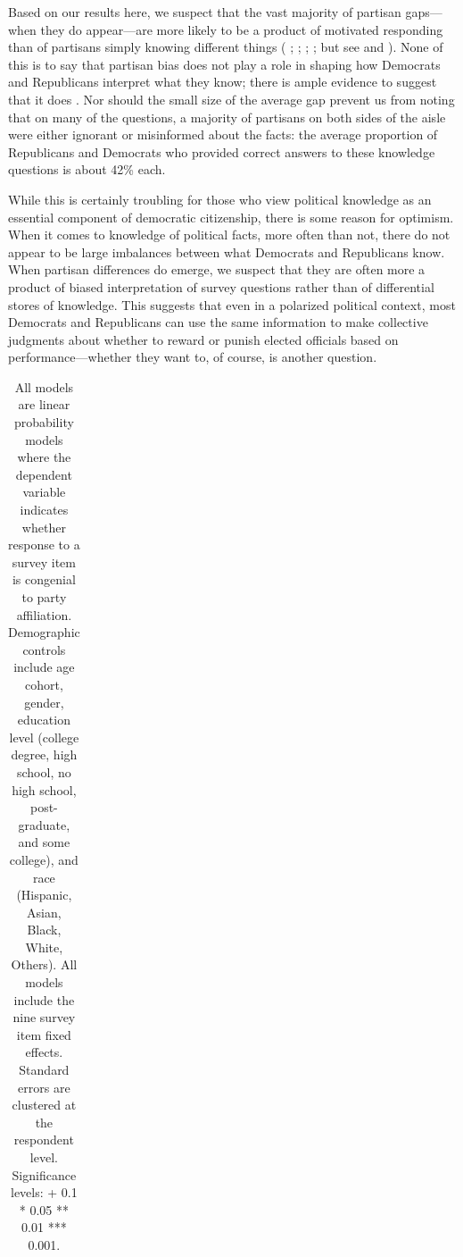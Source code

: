 \documentclass[12pt, letterpaper]{article}
\begin{document}
Based on our results here, we suspect that the vast majority of partisan gaps---when they do appear---are more likely to be a product of motivated responding than of partisans simply knowing different things (\citeauthor{bisgaard_slothuus_2018} \citeyear{bisgaard_slothuus_2018}; \citeauthor {bullocketal_2015} \citeyear{bullocketal_2015}; \citeauthor{prior2015you} \citeyear{prior2015you}; \citeauthor{schaffner_luks} \citeyear{schaffner_luks}; but see \citeauthor{berinsky_2017} \citeyear{berinsky_2017} and \citeauthor{peterson_iyengar_forth} \citeyear{peterson_iyengar_forth}). None of this is to say that partisan bias does not play a role in shaping how Democrats and Republicans interpret what they know; there is ample evidence to suggest that it does \citep[e.g.,][]{bisgaard2015bias, gainesetal_2007, khanna2018motivated}. Nor should the small size of the average gap prevent us from noting that on many of the questions, a majority of partisans on both sides of the aisle were either ignorant or misinformed about the facts: the average proportion of Republicans and Democrats who provided correct answers to these knowledge questions is about 42\% each. 

While this is certainly troubling for those who view political knowledge as an essential component of democratic citizenship, there is some reason for optimism. When it comes to knowledge of political facts, more often than not, there do not appear to be large imbalances between what Democrats and Republicans know. When partisan differences do emerge, we suspect that they are often more a product of biased interpretation of survey questions rather than of differential stores of knowledge. This suggests that even in a polarized political context, most Democrats and Republicans can use the same information to make collective judgments about whether to reward or punish elected officials based on performance---whether they want to, of course, is another question. 


\begin{table}[ht] \centering \small \setlength\tabcolsep{0 pt} \setlength{\defaultaddspace}{0pt}
	\def\sym#1{\ifmmode^{#1}\else\(^{#1}\)\fi}
	\begin{adjustbox}{max width=\textwidth}
		\begin{tabular}{l*{6}{D{.}{.}{-1}}}
			\toprule
			
			\bottomrule
		\end{tabular}
	\end{adjustbox}
	\caption*{All models are linear probability models where the dependent variable indicates whether response to a survey item is congenial to party affiliation. Demographic controls include age cohort, gender, education level (college degree, high school, no high school, post-graduate, and some college), and race (Hispanic, Asian, Black, White, Others). All models include the nine survey item fixed effects. Standard errors are clustered at the respondent level. Significance levels: + 0.1 * 0.05 ** 0.01 *** 0.001.}
\end{table}
\end{document}
